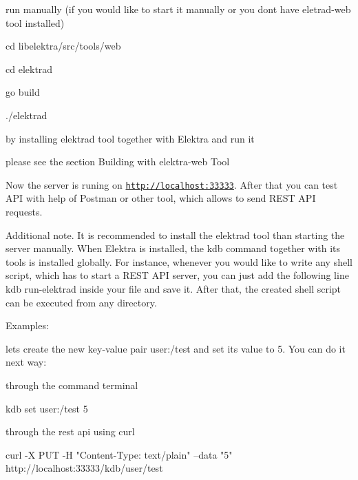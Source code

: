 \begin{DoxyItemize}
\item run manually (if you would like to start it manually or you don\textquotesingle{}t have eletrad-\/web tool installed)
\begin{DoxyItemize}
\item {\ttfamily cd libelektra/src/tools/web}
\item {\ttfamily cd elektrad}
\item {\ttfamily go build}
\item {\ttfamily ./elektrad}
\end{DoxyItemize}
\item by installing elektrad tool together with Elektra and run it
\begin{DoxyItemize}
\item please see the section {\ttfamily Building with elektra-\/web Tool}
\end{DoxyItemize}
\end{DoxyItemize}

Now the server is runing on \href{http://localhost:33333}{\tt http\+://localhost\+:33333}. After that you can test A\+PI with help of Postman or other tool, which allows to send R\+E\+ST A\+PI requests.

Additional note. It is recommended to install the elektrad tool than starting the server manually. When Elektra is installed, the {\ttfamily kdb} command together with its tools is installed globally. For instance, whenever you would like to write any shell script, which has to start a R\+E\+ST A\+PI server, you can just add the following line {\ttfamily kdb run-\/elektrad} inside your file and save it. After that, the created shell script can be executed from any directory.

Examples\+:

let\textquotesingle{}s create the new key-\/value pair {\ttfamily user\+:/test} and set its value to 5. You can do it next way\+:


\begin{DoxyItemize}
\item through the command terminal 
\begin{DoxyCode}
kdb set user:/test 5
\end{DoxyCode}

\item through the rest api using curl 
\begin{DoxyCode}
curl -X PUT -H "Content-Type: text/plain" --data "5" http://localhost:33333/kdb/user/test
\end{DoxyCode}

\end{DoxyItemize}


